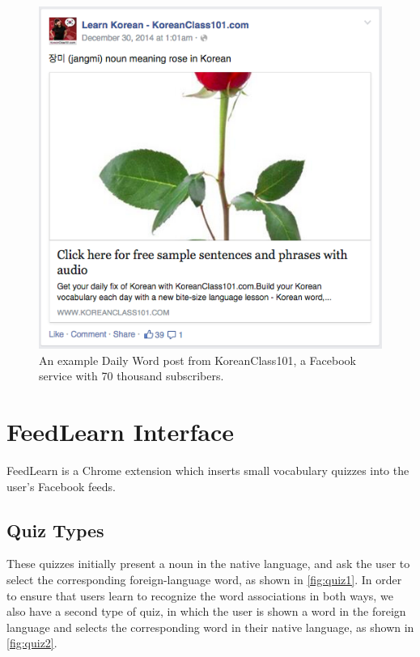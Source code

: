 \documentclass{chi-ext}
\begin{document}
\begin{figure}
\includegraphics[width=\columnwidth]{learn-korean-post.png}
\caption{An example Daily Word post from KoreanClass101, a Facebook service with 70 thousand subscribers.}
\label{fig:learn-korean}
\end{figure}



\section{FeedLearn Interface}

FeedLearn is a Chrome extension which inserts small vocabulary quizzes into the user's Facebook feeds.

\subsection{Quiz Types}

These quizzes initially present a noun in the native language, and ask the user to select the corresponding foreign-language word, as shown in \autoref{fig:quiz1}. In order to ensure that users learn to recognize the word associations in both ways, we also have a second type of quiz, in which the user is shown a word in the foreign language and selects the corresponding word in their native language, as shown in \autoref{fig:quiz2}.
\end{document}
